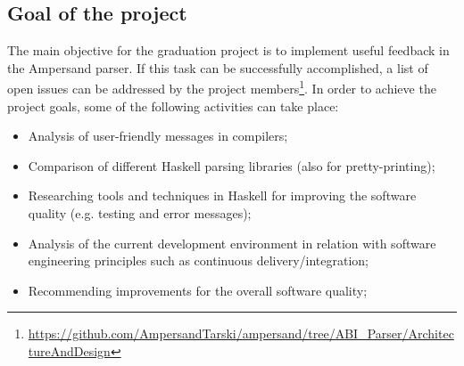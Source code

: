 \subsection{Goal of the project}
The main objective for the graduation project is to implement useful feedback in the Ampersand parser.
If this task can be successfully accomplished, a list of open issues can be addressed by the project members\footnote{\url{https://github.com/AmpersandTarski/ampersand/tree/ABI\_Parser/ArchitectureAndDesign}}.
In order to achieve the project goals, some of the following activities can take place:
\begin{itemize}
	\item Analysis of user-friendly messages in compilers;
	\item Comparison of different Haskell parsing libraries (also for pretty-printing);
	\item Researching tools and techniques in Haskell for improving the software quality (e.g. testing and error messages);
	\item Analysis of the current development environment in relation with software engineering principles such as continuous delivery/integration;
	\item Recommending improvements for the overall software quality;
\end{itemize}

